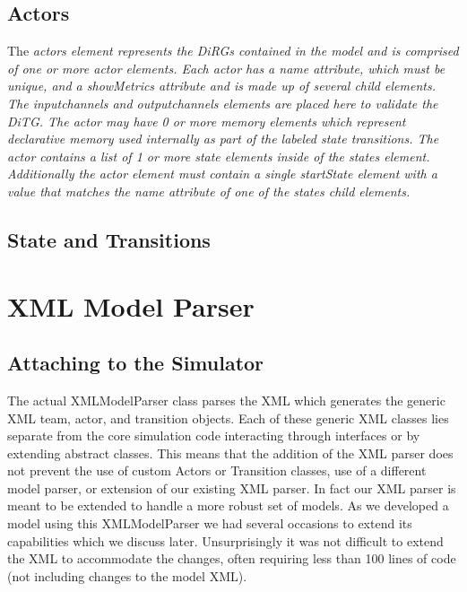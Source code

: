 \begin{spacing}{.5}

\end{spacing}

\subsection{Actors}

The \em{actors} element represents the DiRGs contained in the model and is comprised of one or more \em{actor} elements.  Each \em{actor} has a name attribute, which must be unique, and a showMetrics attribute and is made up of several child elements.  The \em{inputchannels} and \em{outputchannels} elements are placed here to validate the DiTG.  The \em{actor} may have 0 or more \em{memory} elements which represent declarative memory used internally as part of the labeled state transitions.  The \em{actor} contains a list of 1 or more \em{state} elements inside of the \em{states} element.  Additionally the \em{actor} element must contain a single \em{startState} element with a value that matches the name attribute of one of the \em{states} child elements.

\begin{spacing}{.5}

\end{spacing}


\subsection{State and Transitions}



\section{XML Model Parser}

\subsection{Attaching to the Simulator}

The actual XMLModelParser class parses the XML which generates the generic XML team, actor, and transition objects.  Each of these generic XML classes lies separate from the core simulation code interacting through interfaces or by extending abstract classes.  This means that the addition of the XML parser does not prevent the use of custom Actors or Transition classes, use of a different model parser, or extension of our existing XML parser.  In fact our XML parser is meant to be extended to handle a more robust set of models.   As we developed a model using this XMLModelParser we had several occasions to extend its capabilities which we discuss later.  Unsurprisingly it was not difficult to extend the XML to accommodate the changes, often requiring less than 100 lines of code (not including changes to the model XML).

